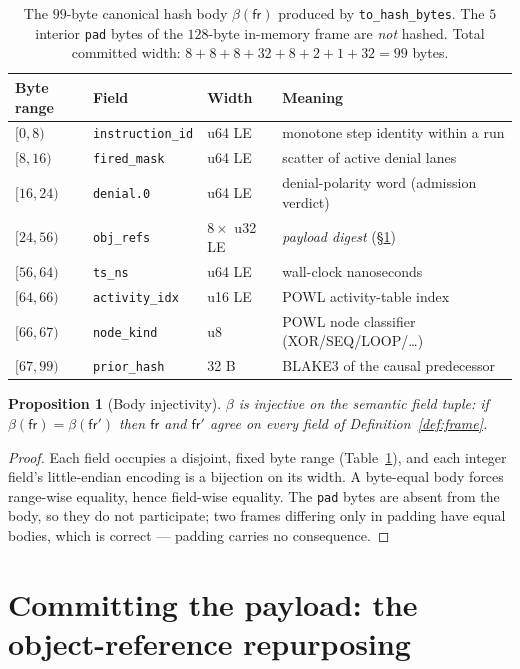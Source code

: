 \documentclass[11pt,oneside]{book}
\theoremstyle{definition}
\theoremstyle{plain}
\newtheorem{proposition}[theorem]{Proposition}
\theoremstyle{remark}
\newcommand{\fr}{\mathsf{fr}}                   %
\newcommand{\body}{\beta}                       %
\newcommand{\code}[1]{\texttt{#1}}
\begin{document}
\begin{table}[t]
\centering
\begin{tabular}{llll}
\toprule
Byte range & Field & Width & Meaning\\
\midrule
$[0,8)$   & \code{instruction\_id} & u64 LE & monotone step identity within a run\\
$[8,16)$  & \code{fired\_mask}     & u64 LE & scatter of active denial lanes\\
$[16,24)$ & \code{denial.0}        & u64 LE & denial-polarity word (admission verdict)\\
$[24,56)$ & \code{obj\_refs}       & $8\times$ u32 LE & \emph{payload digest} (\S\ref{sec:commit})\\
$[56,64)$ & \code{ts\_ns}          & u64 LE & wall-clock nanoseconds\\
$[64,66)$ & \code{activity\_idx}   & u16 LE & POWL activity-table index\\
$[66,67)$ & \code{node\_kind}      & u8     & POWL node classifier (XOR/SEQ/LOOP/\dots)\\
$[67,99)$ & \code{prior\_hash}     & 32 B   & BLAKE3 of the causal predecessor\\
\bottomrule
\end{tabular}
\caption{The $99$-byte canonical hash body $\body(\fr)$ produced by \code{to\_hash\_bytes}.
The $5$ interior \code{pad} bytes of the $128$-byte in-memory frame are \emph{not} hashed.
Total committed width: $8+8+8+32+8+2+1+32=99$ bytes.}
\label{tab:layout}
\end{table}

\begin{proposition}[Body injectivity]\label{prop:bodyinj}
$\body$ is injective on the semantic field tuple: if $\body(\fr)=\body(\fr')$ then $\fr$ and
$\fr'$ agree on every field of Definition~\ref{def:frame}.
\end{proposition}

\begin{proof}
Each field occupies a disjoint, fixed byte range (Table~\ref{tab:layout}), and each
integer field's little-endian encoding is a bijection on its width. A byte-equal body forces
range-wise equality, hence field-wise equality. The \code{pad} bytes are absent from the
body, so they do not participate; two frames differing only in padding have equal bodies,
which is correct --- padding carries no consequence. \end{proof}

\section{Committing the payload: the object-reference repurposing}
\label{sec:commit}
\end{document}
